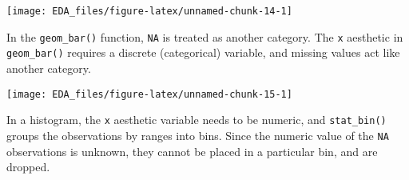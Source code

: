 \documentclass[]{book}
\newenvironment{Shaded}{\begin{snugshade}}{\end{snugshade}}
\newcommand{\CommentTok}[1]{\textcolor[rgb]{0.56,0.35,0.01}{\textit{#1}}}
\newcommand{\DataTypeTok}[1]{\textcolor[rgb]{0.13,0.29,0.53}{#1}}
\newcommand{\DecValTok}[1]{\textcolor[rgb]{0.00,0.00,0.81}{#1}}
\newcommand{\FloatTok}[1]{\textcolor[rgb]{0.00,0.00,0.81}{#1}}
\newcommand{\KeywordTok}[1]{\textcolor[rgb]{0.13,0.29,0.53}{\textbf{#1}}}
\newcommand{\NormalTok}[1]{#1}
\newcommand{\OperatorTok}[1]{\textcolor[rgb]{0.81,0.36,0.00}{\textbf{#1}}}
\newcommand{\OtherTok}[1]{\textcolor[rgb]{0.56,0.35,0.01}{#1}}
\newcommand{\StringTok}[1]{\textcolor[rgb]{0.31,0.60,0.02}{#1}}
\theoremstyle{plain}
\theoremstyle{remark}
\begin{document}
\begin{Shaded}
\end{Shaded}

\begin{center}\texttt{[image: EDA\_files/figure-latex/unnamed-chunk-14-1]} \end{center}

In the \texttt{geom\_bar()} function, \texttt{NA} is treated as another
category. The \texttt{x} aesthetic in \texttt{geom\_bar()} requires a
discrete (categorical) variable, and missing values act like another
category.

\begin{Shaded}
\end{Shaded}

\begin{center}\texttt{[image: EDA\_files/figure-latex/unnamed-chunk-15-1]} \end{center}

In a histogram, the \texttt{x} aesthetic variable needs to be numeric,
and \texttt{stat\_bin()} groups the observations by ranges into bins.
Since the numeric value of the \texttt{NA} observations is unknown, they
cannot be placed in a particular bin, and are dropped.
\end{document}
